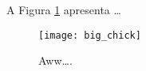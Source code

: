 \documentclass{article}
\begin{document}
A Figura \ref{fig:chick} apresenta
\ldots

\begin{figure}
\centering
\texttt{[image: big\_chick]}
\caption{\label{fig:chick}Aww\ldots.}
\end{figure}
\end{document}
